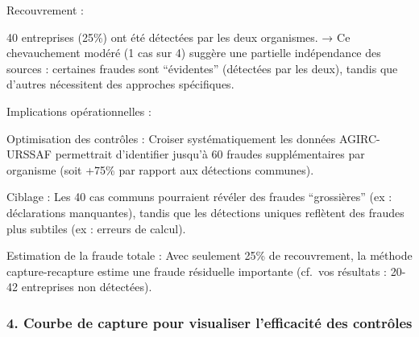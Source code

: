 \documentclass[
]{article}
\begin{document}
Recouvrement :

40 entreprises (25\%) ont été détectées par les deux organismes. → Ce
chevauchement modéré (1 cas sur 4) suggère une partielle indépendance
des sources : certaines fraudes sont ``évidentes'' (détectées par les
deux), tandis que d'autres nécessitent des approches spécifiques.

Implications opérationnelles :

Optimisation des contrôles : Croiser systématiquement les données
AGIRC-URSSAF permettrait d'identifier jusqu'à 60 fraudes supplémentaires
par organisme (soit +75\% par rapport aux détections communes).

Ciblage : Les 40 cas communs pourraient révéler des fraudes
``grossières'' (ex : déclarations manquantes), tandis que les détections
uniques reflètent des fraudes plus subtiles (ex : erreurs de calcul).

Estimation de la fraude totale : Avec seulement 25\% de recouvrement, la
méthode capture-recapture estime une fraude résiduelle importante
(cf.~vos résultats : 20-42 entreprises non détectées).

\subsubsection{4. Courbe de capture pour visualiser l'efficacité des
contrôles}\label{courbe-de-capture-pour-visualiser-lefficacituxe9-des-contruxf4les}
\end{document}
